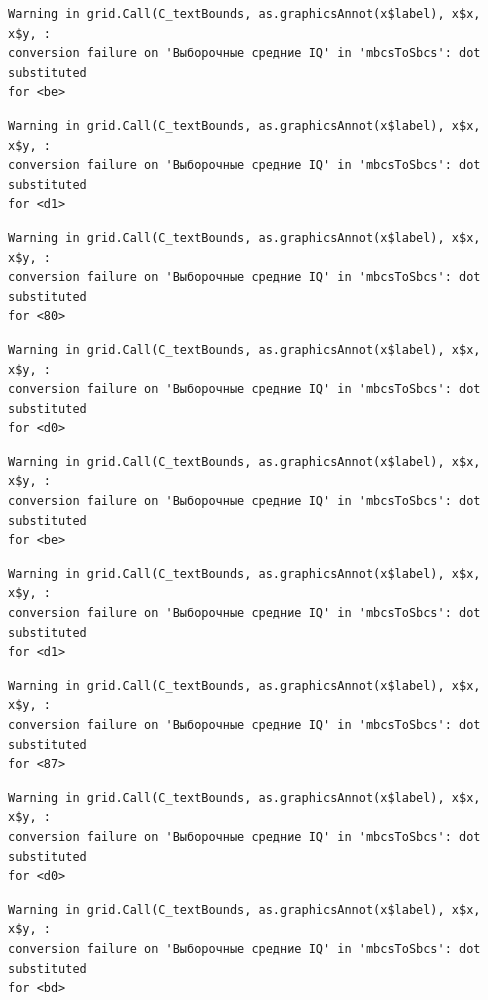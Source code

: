 \documentclass[
  letterpaper,
  DIV=11,
  numbers=noendperiod]{scrreprt}
\theoremstyle{definition}
\theoremstyle{remark}
\begin{document}
\begin{verbatim}
Warning in grid.Call(C_textBounds, as.graphicsAnnot(x$label), x$x, x$y, :
conversion failure on 'Выборочные средние IQ' in 'mbcsToSbcs': dot substituted
for <be>
\end{verbatim}

\begin{verbatim}
Warning in grid.Call(C_textBounds, as.graphicsAnnot(x$label), x$x, x$y, :
conversion failure on 'Выборочные средние IQ' in 'mbcsToSbcs': dot substituted
for <d1>
\end{verbatim}

\begin{verbatim}
Warning in grid.Call(C_textBounds, as.graphicsAnnot(x$label), x$x, x$y, :
conversion failure on 'Выборочные средние IQ' in 'mbcsToSbcs': dot substituted
for <80>
\end{verbatim}

\begin{verbatim}
Warning in grid.Call(C_textBounds, as.graphicsAnnot(x$label), x$x, x$y, :
conversion failure on 'Выборочные средние IQ' in 'mbcsToSbcs': dot substituted
for <d0>
\end{verbatim}

\begin{verbatim}
Warning in grid.Call(C_textBounds, as.graphicsAnnot(x$label), x$x, x$y, :
conversion failure on 'Выборочные средние IQ' in 'mbcsToSbcs': dot substituted
for <be>
\end{verbatim}

\begin{verbatim}
Warning in grid.Call(C_textBounds, as.graphicsAnnot(x$label), x$x, x$y, :
conversion failure on 'Выборочные средние IQ' in 'mbcsToSbcs': dot substituted
for <d1>
\end{verbatim}

\begin{verbatim}
Warning in grid.Call(C_textBounds, as.graphicsAnnot(x$label), x$x, x$y, :
conversion failure on 'Выборочные средние IQ' in 'mbcsToSbcs': dot substituted
for <87>
\end{verbatim}

\begin{verbatim}
Warning in grid.Call(C_textBounds, as.graphicsAnnot(x$label), x$x, x$y, :
conversion failure on 'Выборочные средние IQ' in 'mbcsToSbcs': dot substituted
for <d0>
\end{verbatim}

\begin{verbatim}
Warning in grid.Call(C_textBounds, as.graphicsAnnot(x$label), x$x, x$y, :
conversion failure on 'Выборочные средние IQ' in 'mbcsToSbcs': dot substituted
for <bd>
\end{verbatim}
\end{document}
